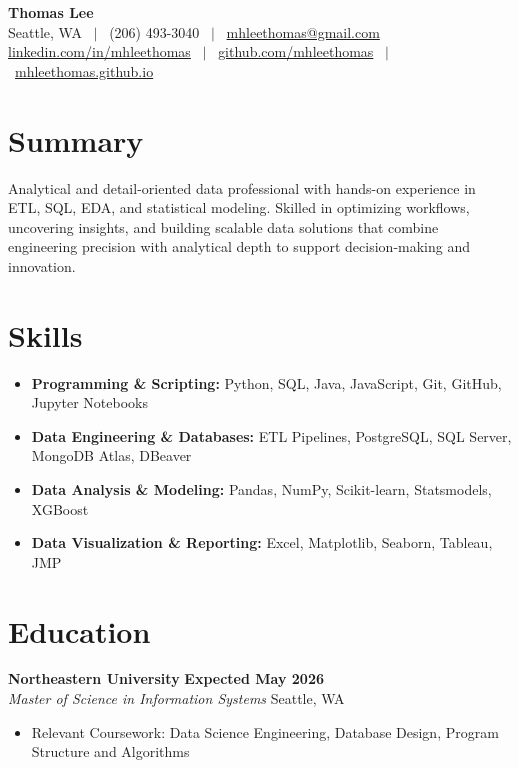 \documentclass[letterpaper,11pt]{article}
\begin{document}
\pagestyle{empty}

\begin{center}
  {\LARGE\bfseries Thomas Lee}\\[4pt]
  Seattle, WA \ $|$ \ (206) 493-3040 \ $|$ \ \href{mailto:mhleethomas@gmail.com}{mhleethomas@gmail.com}\\[2pt]
  \href{https://linkedin.com/in/mhleethomas}{linkedin.com/in/mhleethomas} \ $|$ \
  \href{https://github.com/mhleethomas}{github.com/mhleethomas} \ $|$ \
  \href{https://mhleethomas.github.io}{mhleethomas.github.io}
\end{center}

\section{Summary}
Analytical and detail-oriented data professional with hands-on experience in ETL, SQL, EDA, and statistical
modeling. Skilled in optimizing workflows, uncovering insights, and building scalable data solutions that
combine engineering precision with analytical depth to support decision-making and innovation.

\section{Skills}
\begin{itemize}
  \item \textbf{Programming \& Scripting:} Python, SQL, Java, JavaScript, Git, GitHub, Jupyter Notebooks
  \item \textbf{Data Engineering \& Databases:} ETL Pipelines, PostgreSQL, SQL Server, MongoDB Atlas, DBeaver
  \item \textbf{Data Analysis \& Modeling:} Pandas, NumPy, Scikit-learn, Statsmodels, XGBoost
  \item \textbf{Data Visualization \& Reporting:} Excel, Matplotlib, Seaborn, Tableau, JMP
\end{itemize}

\section{Education}

\textbf{Northeastern University} \hfill \textbf{Expected May 2026}\\
\textit{Master of Science in Information Systems} \hfill Seattle, WA
\begin{itemize}
  \item Relevant Coursework: Data Science Engineering, Database Design, Program Structure and Algorithms
\end{itemize}
\end{document}

